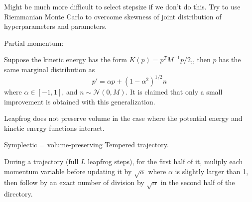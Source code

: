 \documentclass{book}
\begin{document}
\begin{enumerate}
Might be much more difficult to select stepsize if we don't do this. Try to use Riemmanian Monte Carlo to overcome skewness of joint distribution of hyperparameters and parameters. 

Partial momentum:

Suppose the kinetic energy has the form $K(p) = p^TM^{-1}p/2$,, then $p$ has the same marginal distribution as 
\[ p' = \alpha p + (1-\alpha^2)^{1/2} n \]
where $\alpha \in [-1,1]$, and $n \sim \mathcal{N}(0,M)$. 
It is claimed that only a small improvement is obtained with this generalization.

Leapfrog does not preserve volume in the case where the potential energy and kinetic energy functions interact.

Symplectic  = volume-preserving
Tempered trajectory. 

During a trajectory (full $L$ leapfrog steps), for the first half of it, muliply
each momentum variable before updating it by $\sqrt{\alpha}$ where $\alpha$ is slightly larger than
1, then follow by an exact number of division by $\sqrt{\alpha}$ in the second
half of the directory. \cite{neal1996sampling}

\end{enumerate}
\end{document}
